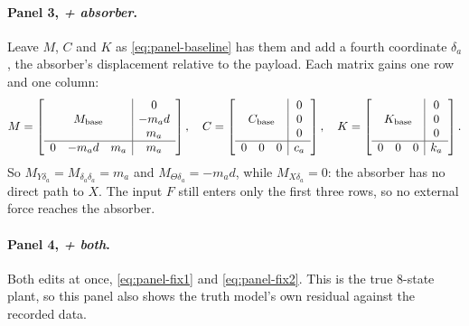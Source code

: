 \paragraph{Panel 3, \textit{+ absorber}.}
Leave $M$, $C$ and $K$ as \eqref{eq:panel-baseline} has them and add a fourth coordinate
$\delta_a$, the absorber's displacement relative to the payload. Each matrix gains one row and
one column:
%
\begin{equation}
  M =
  \left[\begin{array}{ccc|c}
    \multicolumn{3}{c|}{\multirow{3}{*}{$M_{\mathrm{base}}$}} & 0      \\
    \multicolumn{3}{c|}{}                                     & -m_a d \\
    \multicolumn{3}{c|}{}                                     & m_a    \\ \hline
    0 & -m_a d & m_a                                          & m_a
  \end{array}\right],
  \quad
  C =
  \left[\begin{array}{ccc|c}
    \multicolumn{3}{c|}{\multirow{3}{*}{$C_{\mathrm{base}}$}} & 0 \\
    \multicolumn{3}{c|}{}                                     & 0 \\
    \multicolumn{3}{c|}{}                                     & 0 \\ \hline
    0 & 0 & 0                                                 & c_a
  \end{array}\right],
  \quad
  K =
  \left[\begin{array}{ccc|c}
    \multicolumn{3}{c|}{\multirow{3}{*}{$K_{\mathrm{base}}$}} & 0 \\
    \multicolumn{3}{c|}{}                                     & 0 \\
    \multicolumn{3}{c|}{}                                     & 0 \\ \hline
    0 & 0 & 0                                                 & k_a
  \end{array}\right].
  \label{eq:panel-fix2}
\end{equation}
%
So $M_{Y\delta_a} = M_{\delta_a\delta_a} = m_a$ and $M_{\Theta\delta_a} = -m_a d$, while
$M_{X\delta_a} = 0$: the absorber has no direct path to $X$. The input $F$ still enters only the
first three rows, so no external force reaches the absorber.

\paragraph{Panel 4, \textit{+ both}.}
Both edits at once, \eqref{eq:panel-fix1} and \eqref{eq:panel-fix2}. This is the true $8$-state
plant, so this panel also shows the truth model's own residual against the recorded data.


